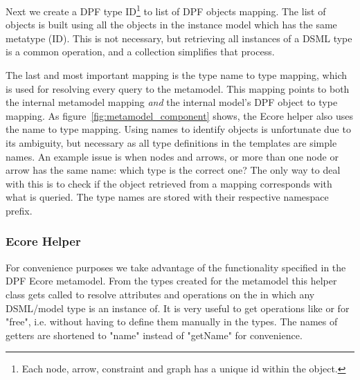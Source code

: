 Next we create a DPF type ID\footnote{Each node, arrow, constraint and graph has a unique id within the  object.} to list of DPF objects mapping. The list of objects is built using all the objects in the instance model which has the same metatype (ID). This is not necessary, but retrieving all instances of a DSML type is a common operation, and a collection simplifies that process. 

The last and most important mapping is the type name to type mapping, which is used for resolving every query to the metamodel. This mapping points to both the internal metamodel mapping \emph{and} the internal model's DPF object to type mapping. As figure~\ref{fig:metamodel_component} shows, the Ecore helper also uses the name to type mapping. Using names to identify objects is unfortunate due to its ambiguity, but necessary as all type definitions in the templates are simple names. An example issue is when nodes and arrows, or more than one node or arrow has the same name: which type is the correct one? The only way to deal with this is to check if the object retrieved from a mapping corresponds with what is queried. The type names are stored with their respective namespace prefix.

\subsubsection{Ecore Helper}
For convenience purposes we take advantage of the functionality specified in the DPF Ecore metamodel. From the types created for the metamodel this helper class gets called to resolve attributes and operations on the  in which any DSML/model type is an instance of. It is very useful to get operations like  or  for "free", i.e. without having to define them manually in the types. The names of getters are shortened to "name" instead of "getName" for convenience.

